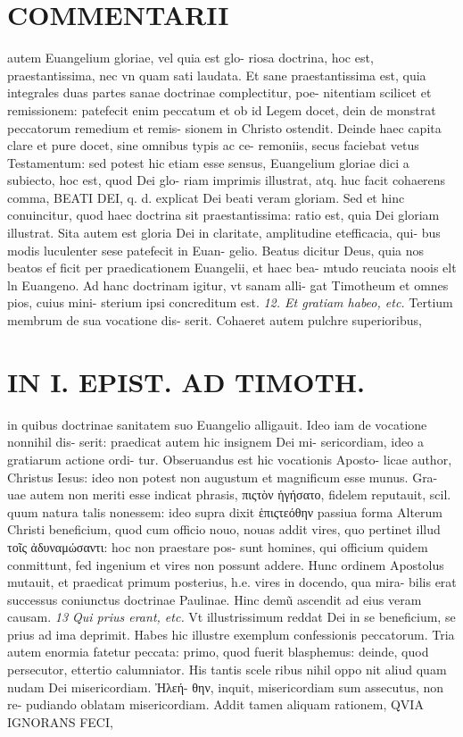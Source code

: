 \documentclass{article}
\begin{document}
\begin{pages}
\section*{COMMENTARII }
\marginpar{[ p.30 ]}\pstart autem Euangelium gloriae, vel quia est glo- riosa doctrina, hoc est, praestantissima, nec vn quam sati laudata.  \pend\pstart Et sane praestantissima est, quia integrales duas partes sanae doctrinae complectitur, poe- nitentiam scilicet et remissionem: patefecit enim peccatum et ob id Legem docet, dein de monstrat peccatorum remedium et remis- sionem in Christo ostendit. Deinde haec capita clare et pure docet, sine omnibus typis ac ce- remoniis, secus faciebat vetus Testamentum: sed potest hic etiam esse sensus, Euangelium gloriae dici a subiecto, hoc est, quod Dei glo- riam imprimis illustrat, atq. huc facit cohaerens comma, BEATI DEI, q. d. explicat Dei beati veram gloriam. Sed et hinc conuincitur, quod haec doctrina sit praestantissima: ratio est, quia Dei gloriam illustrat. Sita autem est gloria Dei in claritate, amplitudine etefficacia, qui- bus modis luculenter sese patefecit in Euan- gelio. Beatus dicitur Deus, quia nos beatos ef ficit per praedicationem Euangelii, et haec bea- mtudo reuciata noois elt ln Euangeno.  \pend\pstart Ad hanc doctrinam igitur, vt sanam alli- gat Timotheum et omnes pios, cuius mini- sterium ipsi concreditum est.  \pend
\textit{12. Et gratiam habeo, etc. }\pstart Tertium membrum de sua vocatione dis- serit. Cohaeret autem pulchre superioribus,  \pend
\section*{IN I. EPIST. AD TIMOTH. }
\marginpar{[ p.31 ]}\pstart in quibus doctrinae sanitatem suo Euangelio alligauit. Ideo iam de vocatione nonnihil dis- serit: praedicat autem hic insignem Dei mi- sericordiam, ideo a gratiarum actione ordi- tur. Obseruandus est hic vocationis Aposto- licae author, Christus Iesus: ideo non potest non augustum et magnificum esse munus. Gra- uae autem non meriti esse indicat phrasis, πιςτὸν ἡγήσατο, fidelem reputauit, scil. quum natura talis nonessem: ideo supra dixit ἑπιςτεόθην passiua forma Alterum Christi beneficium, quod cum officio nouo, nouas addit vires, quo pertinet illud τοῖς ἀδυναμώσαντι: hoc non praestare pos- sunt homines, qui officium quidem conmittunt, fed ingenium et vires non possunt addere. Hunc ordinem Apostolus mutauit, et praedicat primum posterius, h.e. vires in docendo, qua mira- bilis erat successus coniunctus doctrinae Paulinae. Hinc demũ ascendit ad eius veram causam.  \pend
\textit{13 Qui prius erant, etc. }\pstart Vt illustrissimum reddat Dei in se beneficium, se prius ad ima deprimit. Habes hic illustre exemplum confessionis peccatorum. Tria autem enormia fatetur peccata: primo, quod fuerit blasphemus: deinde, quod persecutor, ettertio calumniator. His tantis scele ribus nihil oppo nit aliud quam nudam Dei misericordiam. Ἠλεή- θην, inquit, misericordiam sum assecutus, non re- pudiando oblatam misericordiam. Addit tamen aliquam rationem, QVIA IGNORANS FECI,  \pend

\end{pages}
\end{document}
